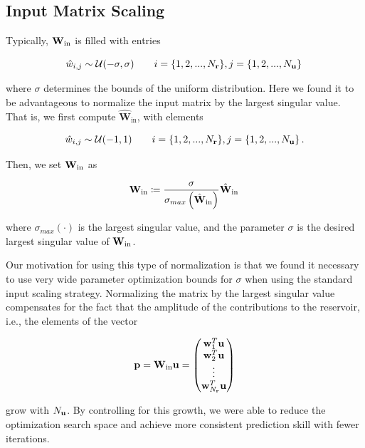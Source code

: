 \documentclass[draft]{agujournal2019}
\begin{document}
\subsection{Input Matrix Scaling}
\label{subsec:input-scaling}

Typically, $\mathbf{W}_\text{in}$ is filled with entries
\begin{linenomath*}\begin{equation*}
    \hat{w}_{i,j} \sim \mathcal{U}(-\sigma,\sigma) \qquad
    i = \{1, 2, ..., N_{\mathbf{r}}\}, j=\{1,2, ..., N_{\mathbf{u}}\} \,
\end{equation*}\end{linenomath*}
where $\sigma$ determines the bounds of the uniform
distribution.
Here we found it to be advantageous to normalize the input matrix by the
largest singular value.
That is, we first compute $\hat{\mathbf{W}}_\text{in}$, with elements
\begin{linenomath*}\begin{equation*}
    \hat{w}_{i,j} \sim \mathcal{U}(-1,1) \qquad
    i = \{1, 2, ..., N_{\mathbf{r}}\}, j=\{1,2, ..., N_{\mathbf{u}}\} \, .
\end{equation*}\end{linenomath*}
Then, we set $\mathbf{W}_\text{in}$ as
\begin{linenomath*}\begin{equation*}
    \mathbf{W}_\text{in} \coloneqq
    \dfrac{\sigma}{\sigma_{max}\left(\hat{\mathbf{W}}_\text{in}\right)}
    \hat{\mathbf{W}}_\text{in} \,
\end{equation*}\end{linenomath*}
where $\sigma_{max}\left(\cdot\right)$ is the largest singular value, and
the parameter $\sigma$ is the desired largest singular value of
$\mathbf{W}_\text{in}$.

Our motivation for using this type of normalization is that we found it
necessary to use very wide parameter optimization bounds for $\sigma$ when
using the standard input scaling strategy.
Normalizing the matrix by the largest singular value compensates for the fact that
the amplitude of the contributions to the reservoir, i.e., the elements of the
vector
\begin{linenomath*}\begin{equation*}
    \mathbf{p} = \mathbf{W}_\text{in} \mathbf{u} =
    \begin{pmatrix}
        \mathbf{w}_1^T\mathbf{u} \\
        \mathbf{w}_2^T\mathbf{u} \\
        \vdots \\
        \mathbf{w}_{N_{\mathbf{r}}}^T\mathbf{u}
    \end{pmatrix}
\end{equation*}\end{linenomath*}
grow with $N_{\mathbf{u}}$.
By controlling for this growth, we were able to reduce the optimization search
space and achieve more consistent prediction skill with fewer iterations.
\end{document}
